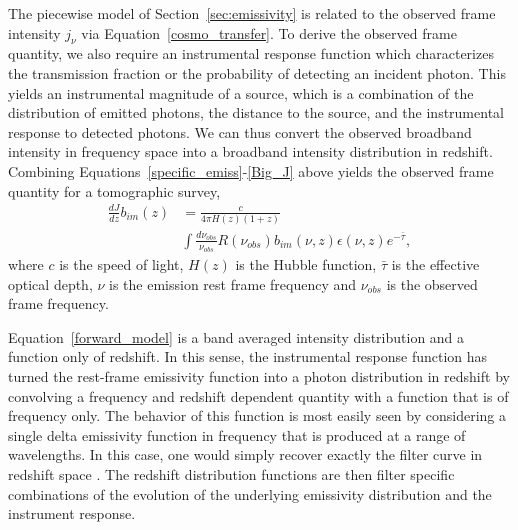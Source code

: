 \documentclass[fleqn,usenatbib]{mnras}
\begin{document}
The piecewise model of Section~\ref{sec:emissivity} is related to the observed frame intensity $j_\nu$ via Equation~\ref{cosmo_transfer}.
To derive the observed frame quantity, we also require an instrumental response function which characterizes the transmission fraction or the probability of detecting an incident photon. This yields an instrumental magnitude of a source, which is a combination of the distribution of emitted photons, the distance to the source, and the instrumental response to detected photons. We can thus convert the observed broadband intensity in frequency space into a broadband intensity distribution in redshift. 
Combining Equations~\ref{specific_emiss}-\ref{Big_J} above yields the observed frame quantity for a tomographic survey,
\begin{equation}
\label{forward_model}
\begin{split}
\frac{dJ}{dz} b_{im}(z) &= \frac{c}{4\pi H(z) (1+z)}  \\ 
&\int \frac{d\nu_{obs}}{\nu_{obs}} R(\nu_{obs}) b_{im}(\nu, z) \epsilon(\nu, z) e^{-\bar{\tau}},
\end{split}
\end{equation} 
where $c$ is the speed of light, $H(z)$ is the Hubble function, $\bar{\tau}$ is the effective optical depth, $\nu$ is the emission rest frame frequency and $\nu_{obs}$ is the observed frame frequency.  

Equation~\ref{forward_model} is a band averaged intensity distribution and a function only of redshift. In this sense, the instrumental response function has turned the rest-frame emissivity function into a photon distribution in redshift by convolving a frequency and redshift dependent quantity with a function that is of frequency only.  The behavior of this function is most easily seen by considering a single delta emissivity function in frequency that is produced at a range of wavelengths. In this case, one would simply recover exactly the filter curve in redshift space \citep[Figure 1 of ][]{Chiang_2019}. The redshift distribution functions are then filter specific combinations of the evolution of the underlying emissivity distribution and the instrument response. 
\end{document}
